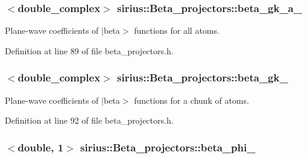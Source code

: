 \subsubsection[{beta\+\_\+gk\+\_\+a\+\_\+}]{$<$double\+\_\+complex$>$ sirius\+::\+Beta\+\_\+projectors\+::beta\+\_\+gk\+\_\+a\+\_\+\hspace{0.3cm}{\ttfamily [protected]}}\label{classsirius_1_1_beta__projectors_a9503b0e8abcbc76361db077f9cd69927}


Plane-\/wave coefficients of $\vert$beta$>$ functions for all atoms. 



Definition at line 89 of file beta\+\_\+projectors.\+h.

\hypertarget{classsirius_1_1_beta__projectors_a9fff826234ee6a2fb6104bc6edcdb6e3}{}
\subsubsection[{beta\+\_\+gk\+\_\+}]{$<$double\+\_\+complex$>$ sirius\+::\+Beta\+\_\+projectors\+::beta\+\_\+gk\+\_\+\hspace{0.3cm}{\ttfamily [protected]}}\label{classsirius_1_1_beta__projectors_a9fff826234ee6a2fb6104bc6edcdb6e3}


Plane-\/wave coefficients of $\vert$beta$>$ functions for a chunk of atoms. 



Definition at line 92 of file beta\+\_\+projectors.\+h.

\hypertarget{classsirius_1_1_beta__projectors_a47cc90705d37315cb5b319249693e091}{}
\subsubsection[{beta\+\_\+phi\+\_\+}]{$<$double, 1$>$ sirius\+::\+Beta\+\_\+projectors\+::beta\+\_\+phi\+\_\+\hspace{0.3cm}{\ttfamily [protected]}}\label{classsirius_1_1_beta__projectors_a47cc90705d37315cb5b319249693e091}


